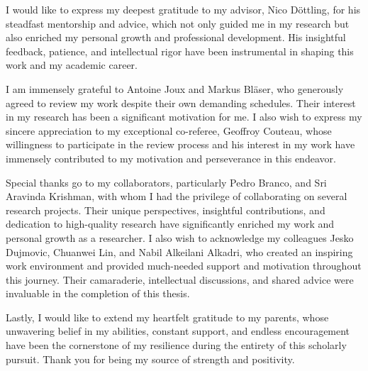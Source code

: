 
 I would like to express my deepest gratitude to my advisor, Nico D\"ottling, for his steadfast mentorship and advice, which not only guided me in my research but also enriched my personal growth and professional development. His insightful feedback, patience, and intellectual rigor have been instrumental in shaping this work and my academic career.

I am immensely grateful to Antoine Joux and Markus Bl\"aser, who generously agreed to review my work despite their own demanding schedules. Their interest in my research has been a significant motivation for me. 
I also wish to express my sincere appreciation to my exceptional co-referee, Geoffroy Couteau, whose willingness to participate in the review process and his interest in my work have immensely contributed to my motivation and perseverance in this endeavor. 

Special thanks go to my collaborators, particularly Pedro Branco, and Sri Aravinda Krishman, with whom I had the privilege of collaborating on several research projects. Their unique perspectives, insightful contributions, and dedication to high-quality research have significantly enriched my work and personal growth as a researcher.
I also wish to acknowledge my colleagues Jesko Dujmovic, Chuanwei Lin, and Nabil Alkeilani Alkadri, who created an inspiring work environment and provided much-needed support and motivation throughout this journey. Their camaraderie, intellectual discussions, and shared advice were invaluable in the completion of this thesis.

Lastly, I would like to extend my heartfelt gratitude to my parents, whose unwavering belief in my abilities, constant support, and endless encouragement have been the cornerstone of my resilience during the entirety of this scholarly pursuit. Thank you for being my source of strength and positivity.
